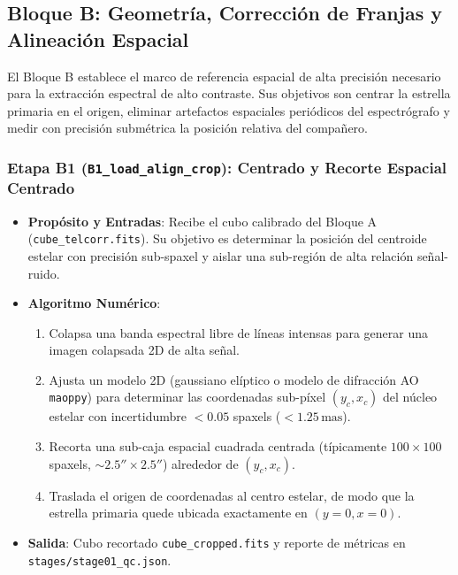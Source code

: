 \documentclass[11pt,a4paper]{article}
\begin{document}
\subsection{Bloque B: Geometría, Corrección de Franjas y Alineación Espacial}

El Bloque B establece el marco de referencia espacial de alta precisión necesario para la extracción espectral de alto contraste. Sus objetivos son centrar la estrella primaria en el origen, eliminar artefactos espaciales periódicos del espectrógrafo y medir con precisión submétrica la posición relativa del compañero.

\subsubsection{Etapa B1 (\texttt{B1\_load\_align\_crop}): Centrado y Recorte Espacial Centrado}
\begin{itemize}[leftmargin=1.0cm]
    \item \textbf{Propósito y Entradas}: Recibe el cubo calibrado del Bloque A (\texttt{cube\_telcorr.fits}). Su objetivo es determinar la posición del centroide estelar con precisión sub-spaxel y aislar una sub-región de alta relación señal-ruido.
    \item \textbf{Algoritmo Numérico}:
    \begin{enumerate}
        \item Colapsa una banda espectral libre de líneas intensas para generar una imagen colapsada 2D de alta señal.
        \item Ajusta un modelo 2D (gaussiano elíptico o modelo de difracción AO \texttt{maoppy}) para determinar las coordenadas sub-píxel $(y_c, x_c)$ del núcleo estelar con incertidumbre $< 0.05$ spaxels ($< 1.25\,\text{mas}$).
        \item Recorta una sub-caja espacial cuadrada centrada (típicamente $100 \times 100$ spaxels, $\sim 2.5'' \times 2.5''$) alrededor de $(y_c, x_c)$.
        \item Traslada el origen de coordenadas al centro estelar, de modo que la estrella primaria quede ubicada exactamente en $(y=0, x=0)$.
    \end{enumerate}
    \item \textbf{Salida}: Cubo recortado \texttt{cube\_cropped.fits} y reporte de métricas en \texttt{stages/stage01\_qc.json}.
\end{itemize}
\end{document}
